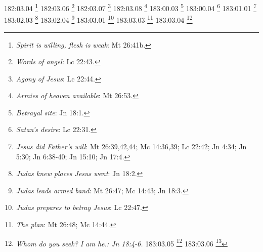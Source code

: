 {{{{{{{{{{{{{{{{{{{{{{{{{{{{{{{{{{{{{{{{{{{{{{{{{{{{{{{{{{{{{{{{{{{{{{{{{{{{{{{{{{{{{{{182:03.04 \footnote{\textit{Spirit is willing, flesh is weak}: Mt 26:41b.}
182:03.06 \footnote{\textit{Words of angel}: Lc 22:43.}
182:03.07 \footnote{\textit{Agony of Jesus}: Lc 22:44.}
182:03.08 \footnote{\textit{Armies of heaven available}: Mt 26:53.}
183:00.03 \footnote{\textit{Betrayal site}: Jn 18:1.}
183:00.04 \footnote{\textit{Satan's desire}: Lc 22:31.}
183:01.01 \footnote{\textit{Jesus did Father's will}: Mt 26:39,42,44; Mc 14:36,39; Lc 22:42; Jn 4:34; Jn 5:30; Jn 6:38-40; Jn 15:10; Jn 17:4.}
183:02.03 \footnote{\textit{Judas knew places Jesus went}: Jn 18:2.}
183:02.04 \footnote{\textit{Judas leads armed band}: Mt 26:47; Mc 14:43; Jn 18:3.}
183:03.01 \footnote{\textit{Judas prepares to betray Jesus}: Lc 22:47.}
183:03.03 \footnote{\textit{The plan}: Mt 26:48; Mc 14:44.}
183:03.04 \footnote{\textit{Whom do you seek? I am he.: Jn 18:4-6.}
183:03.05 \footnote{\textit{Jesus betrayed by a kiss}: Mt 26:49-50a; Mc 14:45; Lc 22:47b-48.}
183:03.06 \footnote{\textit{"Let these go their way": Jn 18:7-8.}
183:03.07 \footnote{\textit{Assault on Malcus}: Mt 26:51; Mc 14:46-47; Lc 22:49-51; Jn 18:10.}
183:03.07 \footnote{\textit{Father wills I drink cup}: Jn 18:11b.}
183:03.07 \footnote{\textit{Heavenly army}: Mt 26:53.}
183:03.07 \footnote{\textit{Jesus rebukes Peter}: Mt 26:52; Jn 18:11a.}
183:03.08 \footnote{\textit{Jesus bound and led away}: Jn 18:12.}
183:03.08 \footnote{\textit{Why take me here?: Mt 26:55; Mc 14:48-49; Lc 22:52-53.}
183:03.09 \footnote{\textit{Followers run away}: Mt 26:56b; Mc 14:50.}
183:03.09 \footnote{\textit{Naked boy}: Mc 14:51-52.}
183:03.10 \footnote{\textit{John follows closely}: Jn 18:15b.}
183:03.10 \footnote{\textit{John Mark gets a cloak}: Mc 14:51-52.}
183:03.10 \footnote{\textit{Peter follows afar off}: Mt 26:58; Mc 14:54; Lc 22:54; Jn 18:15a.}
183:04.06 \footnote{\textit{Shepherd smitten, flock scatters}: Zac 13:7; Mt 26:31; Mc 14:27.}
183:05.01 \footnote{\textit{Jesus taken to Annas}: Jn 18:13.}
183:05.04 \footnote{\textit{John permitted to stay}: Jn 18:15; Jn 19:26-27.}
183:05.05 \footnote{\textit{Jesus silent along the way}: Is 53:7; Hch 8:32.}
184:01.06 \footnote{\textit{Hearing before Annas}: Jn 18:19-23.}
184:01.08 \footnote{\textit{Conversation with Annas}: Mt 26:63b-64; Mc 14:61b-62; Lc 22:67-68,70.}
184:01.09 \footnote{\textit{Jesus taken to Caiaphas}: Mt 26:57; Mc 14:53; Lc 22:54; Jn 18:24.}
184:02.01 \footnote{\textit{Peter enters courtyard}: Mt 26:58; Mc 14:54; Lc 22:54; Jn 18:15-16.}
184:02.02 \footnote{\textit{Peter warms self}: Mc 14:54b; Lc 22:55; Jn 18:18.}
184:02.04 \footnote{\textit{1st denial}: Mt 26:69-70; Mc 14:66-68a; Lc 22:56-57; Jn 18:17.}
}}}}}}}}}}}}}}}}}}}}}}}}}}}}}}}}}}}}}}}}}}}}}}}}}}}}}}}}}}}}}}}}}}}}}}}}}}}}}}}}}}}}}}}}}}
